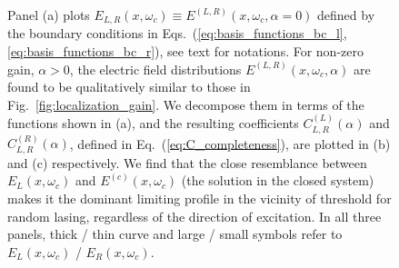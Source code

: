 \begin{figure}
\centerline{}
\caption[Panel (a) plots $E_{L,R}(x,\omega_c)\equiv  E^{(L,R)}(x,\omega_c,\alpha=0)$ defined by the boundary conditions in Eqs.~(\ref{eq:basis_functions_bc_l},\ref{eq:basis_functions_bc_r}), see text for notations.]{Panel (a) plots $E_{L,R}(x,\omega_c)\equiv  E^{(L,R)}(x,\omega_c,\alpha=0)$ defined by the boundary conditions in Eqs.~(\ref{eq:basis_functions_bc_l},\ref{eq:basis_functions_bc_r}), see text for notations. For non-zero gain, $\alpha>0$, the electric field distributions $E^{(L,R)}(x,\omega_c,\alpha)$ are found to be qualitatively similar to those in Fig.~\ref{fig:localization_gain}. We decompose them in terms of the functions shown in (a), and the resulting coefficients $C_{L,R}^{(L)}(\alpha)$ and $C_{L,R}^{(R)}(\alpha)$, defined in Eq.~(\ref{eq:C_completeness}), are plotted in (b) and (c) respectively. We find that the close resemblance between $E_{L}(x,\omega_c)$ and $E^{(c)}(x,\omega_c)$ (the solution in the closed system) makes it the dominant limiting profile in the vicinity of threshold for random lasing, regardless of the direction of excitation. In all three panels, thick / thin curve and large / small symbols refer to  $E_{L}(x,\omega_c)$ / $E_{R}(x,\omega_c)$.\label{fig:alphabeta}}
\end{figure}

